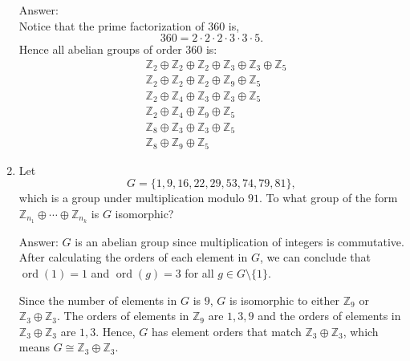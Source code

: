 \documentclass[11pt,twoside]{article}
\newcommand\ord{\operatorname{ord}}
\newcommand\Z{\mathbb{Z}}
\begin{document}
\begin{enumerate}
{\color{red}Answer:}\\
Notice that the prime factorization of $360$ is,
\[ 360 = 2 \cdot 2 \cdot 2 \cdot 3 \cdot 3 \cdot 5. \]
Hence all abelian groups of order $360$ is:
\begin{align*}
&\Z_2 \oplus \Z_2 \oplus \Z_2 \oplus \Z_3 \oplus \Z_3 \oplus \Z_5\\
&\Z_2 \oplus \Z_2 \oplus \Z_2 \oplus \Z_9 \oplus \Z_5\\
&\Z_2 \oplus \Z_4 \oplus \Z_3 \oplus \Z_3 \oplus \Z_5\\
&\Z_2 \oplus \Z_4 \oplus \Z_9 \oplus \Z_5\\
&\Z_8 \oplus \Z_3 \oplus \Z_3 \oplus \Z_5\\
&\Z_8 \oplus \Z_9 \oplus \Z_5
\end{align*}

\vspace{0.25cm}

\item Let
\[ G = \{ 1, 9, 16, 22, 29, 53, 74, 79, 81 \}, \]
which is a group under multiplication modulo $91$.  To what group of the form $\Z_{n_1} \oplus \cdots  \oplus \Z_{n_k}$ is $G$ isomorphic?

{\color{red}Answer:}
$G$ is an abelian group since multiplication of integers is commutative.  After calculating the orders of each element in $G$, we can conclude that $\ord(1) = 1$ and
$\ord(g) = 3$ for all $g\in G \setminus\{1\}$.

Since the number of elements in $G$ is $9$, $G$ is isomorphic to either $\Z_9$ or $\Z_3 \oplus \Z_3$.  The orders of elements in $\Z_9$ are $1,3,9$ and the orders of elements in $\Z_3 \oplus \Z_3$ are $1,3$.  Hence, $G$ has element orders that match $\Z_3 \oplus \Z_3$, which means $G \cong \Z_3 \oplus \Z_3$.

\end{enumerate}
\end{document}
